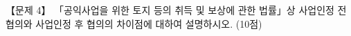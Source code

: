 \begin{longquestion}{【문제 4】}
「공익사업을 위한 토지 등의 취득 및 보상에 관한 법률」상 사업인정 전 협의와 사업인정 후 협의의 차이점에 대하여 설명하시오. (10점) \par
\end{longquestion}
